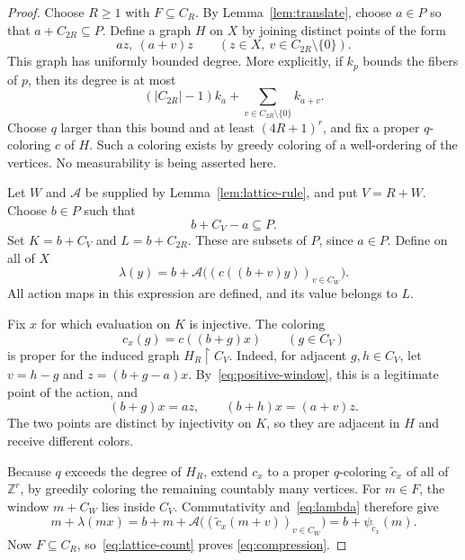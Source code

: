 \documentclass[11pt,letterpaper]{article}
\theoremstyle{definition}
\newcommand{\ZZ}{\mathbb Z}
\begin{document}
\begin{proof}
Choose $R\ge1$ with $F\subseteq C_R$. By Lemma~\ref{lem:translate}, choose
$a\in P$ so that $a+C_{2R}\subseteq P$. Define a graph $H$ on $X$ by
joining distinct points of the form
\begin{equation}\label{eq:auxiliary-edges}
 az,\ (a+v)z
 \qquad(z\in X,\ v\in C_{2R}\setminus\{0\}).
\end{equation}
This graph has uniformly bounded degree. More explicitly, if $k_p$ bounds
the fibers of $p$, then its degree is at most
\[
 (|C_{2R}|-1)k_a+
 \sum_{v\in C_{2R}\setminus\{0\}}k_{a+v}.
\]
Choose $q$ larger than this bound and at least $(4R+1)^r$, and fix a proper
$q$-coloring $c$ of $H$. Such a coloring exists by greedy coloring of a
well-ordering of the vertices. No measurability is being asserted here.

Let $W$ and $\mathcal A$ be supplied by Lemma~\ref{lem:lattice-rule}, and
put $V=R+W$. Choose $b\in P$ such that
\begin{equation}\label{eq:positive-window}
 b+C_V-a\subseteq P.
\end{equation}
Set $K=b+C_V$ and $L=b+C_{2R}$. These are subsets of $P$, since $a\in P$.
Define on all of $X$
\begin{equation}\label{eq:lambda}
 \lambda(y)=b+
 \mathcal A\bigl((c((b+v)y))_{v\in C_W}\bigr).
\end{equation}
All action maps in this expression are defined, and its value belongs to
$L$.

Fix $x$ for which evaluation on $K$ is injective. The coloring
\[
 c_x(g)=c((b+g)x)\qquad(g\in C_V)
\]
is proper for the induced graph $H_R\upharpoonright C_V$. Indeed, for
adjacent $g,h\in C_V$, let $v=h-g$ and
$z=(b+g-a)x$. By~\eqref{eq:positive-window}, this is a legitimate point of
the action, and
\[
 (b+g)x=az,\qquad (b+h)x=(a+v)z.
\]
The two points are distinct by injectivity on $K$, so they are adjacent in
$H$ and receive different colors.

Because $q$ exceeds the degree of $H_R$, extend $c_x$ to a proper
$q$-coloring $\widetilde c_x$ of all of $\ZZ^r$, by greedily coloring the
remaining countably many vertices. For $m\in F$, the window $m+C_W$ lies
inside $C_V$. Commutativity and~\eqref{eq:lambda} therefore give
\[
 m+\lambda(mx)
 =b+m+\mathcal A\bigl((\widetilde c_x(m+v))_{v\in C_W}\bigr)
 =b+\psi_{\widetilde c_x}(m).
\]
Now $F\subseteq C_R$, so~\eqref{eq:lattice-count} proves
\eqref{eq:compression}.
\end{proof}
\end{document}
